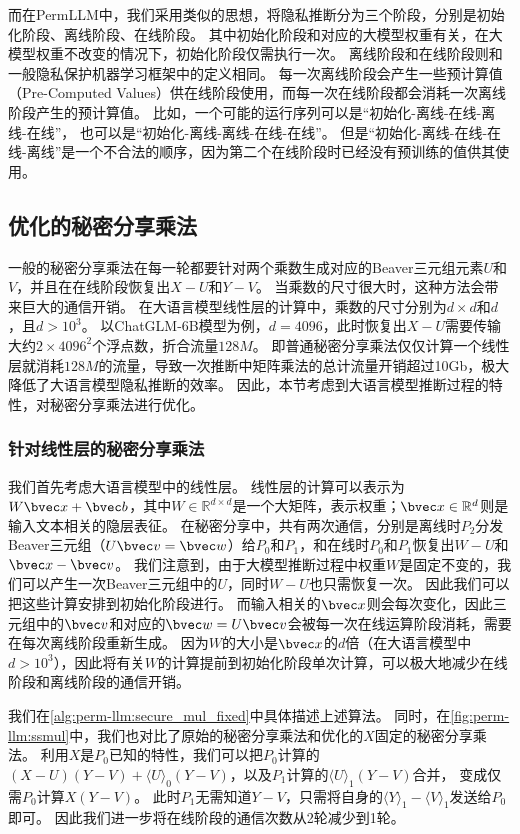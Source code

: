 %
而在PermLLM中，我们采用类似的思想，将隐私推断分为三个阶段，分别是初始化阶段、离线阶段、在线阶段。
%
其中初始化阶段和对应的大模型权重有关，在大模型权重不改变的情况下，初始化阶段仅需执行一次。
%
离线阶段和在线阶段则和一般隐私保护机器学习框架中的定义相同。
每一次离线阶段会产生一些预计算值（Pre-Computed Values）供在线阶段使用，而每一次在线阶段都会消耗一次离线阶段产生的预计算值。
%
比如，一个可能的运行序列可以是“初始化-离线-在线-离线-在线”，
也可以是“初始化-离线-离线-在线-在线”。
但是“初始化-离线-在线-在线-离线”是一个不合法的顺序，因为第二个在线阶段时已经没有预训练的值供其使用。

\subsection{优化的秘密分享乘法}
一般的秘密分享乘法在每一轮都要针对两个乘数生成对应的Beaver三元组元素$U$和$V$，并且在在线阶段恢复出$X - U$和$Y- V$。
当乘数的尺寸很大时，这种方法会带来巨大的通信开销。
%
在大语言模型线性层的计算中，乘数的尺寸分别为$d\times d$和$d$，且$d > 10^3$。
以ChatGLM-6B模型为例，$d = 4096$，此时恢复出$X - U$需要传输大约$2\times 4096^2$个浮点数，折合流量$128M$。
%
即普通秘密分享乘法仅仅计算一个线性层就消耗$128M$的流量，导致一次推断中矩阵乘法的总计流量开销超过10Gb，极大降低了大语言模型隐私推断的效率。
%
因此，本节考虑到大语言模型推断过程的特性，对秘密分享乘法进行优化。

%

\subsubsection{针对线性层的秘密分享乘法}
我们首先考虑大语言模型中的线性层。
%
线性层的计算可以表示为$W \bvec x + \bvec b$，其中$W \in \mathbb R^{d\times d}$是一个大矩阵，表示权重；$\bvec x \in \mathbb R^{d}$则是输入文本相关的隐层表征。
%
在秘密分享中，共有两次通信，分别是离线时$P_2$分发Beaver三元组（$U\bvec v = \bvec w$）给$P_0$和$P_1$，和在线时$P_0$和$P_1$恢复出$W - U$和$\bvec x - \bvec v$。
%
我们注意到，由于大模型推断过程中权重$W$是固定不变的，我们可以产生一次Beaver三元组中的$U$，同时$W - U$也只需恢复一次。
因此我们可以把这些计算安排到初始化阶段进行。
%
而输入相关的$\bvec x$则会每次变化，因此三元组中的$\bvec v$和对应的$\bvec w=U\bvec v$会被每一次在线运算阶段消耗，需要在每次离线阶段重新生成。
%
因为$W$的大小是$\bvec x$的$d$倍（在大语言模型中$d > 10^3$），因此将有关$W$的计算提前到初始化阶段单次计算，可以极大地减少在线阶段和离线阶段的通信开销。


我们在\autoref{alg:perm-llm:secure_mul_fixed}中具体描述上述算法。
同时，在\autoref{fig:perm-llm:ssmul}中，我们也对比了原始的秘密分享乘法和优化的$X$固定的秘密分享乘法。
%
利用$X$是$P_0$已知的特性，我们可以把$P_0$计算的$(X-U)(Y-V) + \langle U \rangle_0(Y-V)$，以及$P_1$计算的$\langle U \rangle_1(Y-V)$合并，
变成仅需$P_0$计算$X(Y-V)$。
%
此时$P_1$无需知道$Y-V$，只需将自身的$\langle Y \rangle_1 - \langle V \rangle_1$发送给$P_0$即可。
因此我们进一步将在线阶段的通信次数从2轮减少到1轮。
%


